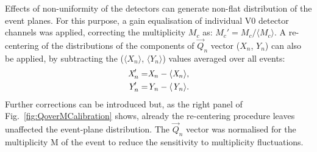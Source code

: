 Effects of non-uniformity of the detectors can generate 
non-flat distribution of the event planes.
For this purpose, a gain equalisation of individual 
V0 detector channels was applied, correcting the multiplicity $M_c$ 
as: $M_c' = M_c / \langle M_c \rangle$. 
A re-centering of the distributions of the components
of $\vec{Q}_n$ vector ($X_n$, $Y_n$) can also be applied, by subtracting
the ($\langle X_n\rangle$, $\langle Y_n \rangle$) values averaged over all events:
\begin{equation}
\begin{split}
\emph{{X}}_n' =& \emph{X}_n - \langle \emph{X}_n \rangle,\\
\emph{{Y}}_n' = &\emph{Y}_n - \langle \emph{Y}_n \rangle.
\end{split}
\end{equation}
Further corrections can be introduced but, as the right panel of 
Fig.~\ref{fig:QoverMCalibration} shows, already the re-centering
procedure leaves unaffected the event-plane distribution.
The $\vec{Q}_n$ vector was normalised for the
multiplicity M of the event to reduce the sensitivity to multiplicity
fluctuations. 


